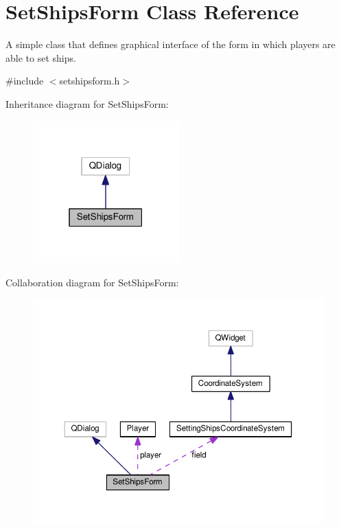 \hypertarget{classSetShipsForm}{}\section{Set\+Ships\+Form Class Reference}
\label{classSetShipsForm}


A simple class that defines graphical interface of the form in which players are able to set ships.  




{\ttfamily \#include $<$setshipsform.\+h$>$}



Inheritance diagram for Set\+Ships\+Form\+:\nopagebreak
\begin{figure}[H]
\begin{center}
\leavevmode
\includegraphics[width=159pt]{classSetShipsForm__inherit__graph}
\end{center}
\end{figure}


Collaboration diagram for Set\+Ships\+Form\+:\nopagebreak
\begin{figure}[H]
\begin{center}
\leavevmode
\includegraphics[width=350pt]{classSetShipsForm__coll__graph}
\end{center}
\end{figure}
